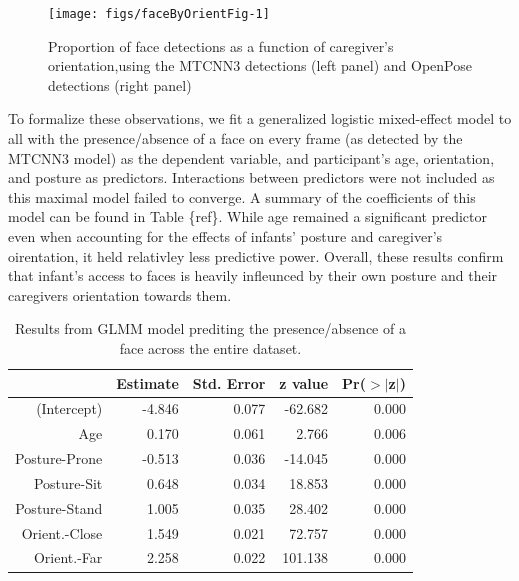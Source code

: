 \documentclass[10pt, letterpaper]{article}
\newenvironment{CodeChunk}{}{}
\begin{document}
\begin{CodeChunk}
\begin{figure}[h]

{\centering \texttt{[image: figs/faceByOrientFig-1]} 

}

\caption[Proportion of face detections as a function of caregiver's orientation,using the MTCNN3 detections (left panel) and OpenPose detections (right panel)]{Proportion of face detections as a function of caregiver's orientation,using the MTCNN3 detections (left panel) and OpenPose detections (right panel)}\label{fig:faceByOrientFig}
\end{figure}
\end{CodeChunk}

To formalize these observations, we fit a generalized logistic
mixed-effect model to all with the presence/absence of a face on every
frame (as detected by the MTCNN3 model) as the dependent variable, and
participant's age, orientation, and posture as predictors. Interactions
between predictors were not included as this maximal model failed to
converge. A summary of the coefficients of this model can be found in
Table \{ref\}. While age remained a significant predictor even when
accounting for the effects of infants' posture and caregiver's
oirentation, it held relativley less predictive power. Overall, these
results confirm that infant's access to faces is heavily infleunced by
their own posture and their caregivers orientation towards them.

\begin{table}[H]
\centering
\begin{tabular}{rrrrr}
  \hline
 & Estimate & Std. Error & z value & Pr($>$$|$z$|$) \\ 
  \hline
(Intercept) & -4.846 & 0.077 & -62.682 & 0.000 \\ 
  Age & 0.170 & 0.061 & 2.766 & 0.006 \\ 
  Posture-Prone & -0.513 & 0.036 & -14.045 & 0.000 \\ 
  Posture-Sit & 0.648 & 0.034 & 18.853 & 0.000 \\ 
  Posture-Stand & 1.005 & 0.035 & 28.402 & 0.000 \\ 
  Orient.-Close & 1.549 & 0.021 & 72.757 & 0.000 \\ 
  Orient.-Far & 2.258 & 0.022 & 101.138 & 0.000 \\ 
   \hline
\end{tabular}
\caption{Results from GLMM model prediting the presence/absence of a face across                       the entire dataset.} 
\end{table}
\end{document}

